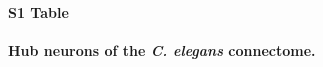 \documentclass[10pt,letterpaper]{article}
\begin{document}


\paragraph*{S1 Table}
{\bf Hub neurons of the \textit{C. elegans} connectome.}
\end{document}
